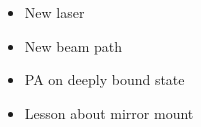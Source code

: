 \documentclass{beamer}
\begin{document}
\begin{frame}{}
  \begin{center}
    \begin{columns}
      \column{6.5cm}
      \column{4cm}
      \begin{block}{}
        \begin{itemize}
        \item<2-> New laser
        \item<3-> New beam path
        \item<4-> PA on deeply bound state
        \item<5-> Lesson about mirror mount
        \end{itemize}
      \end{block}
    \end{columns}
  \end{center}
\end{frame}

\end{document}
